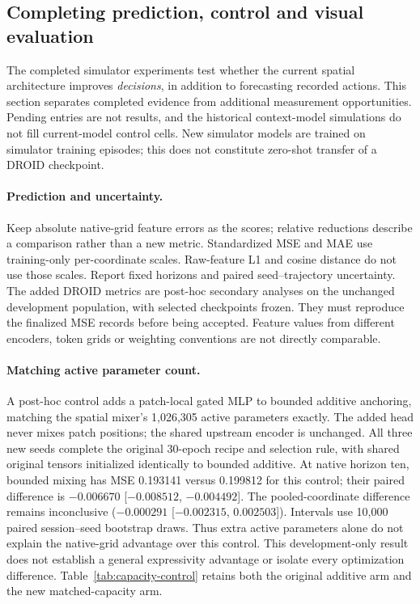 \subsection{Completing prediction, control and visual evaluation}
\label{app:metric-completion}
The completed simulator experiments test whether the current spatial architecture
improves \emph{decisions}, in addition to forecasting recorded actions. This section
separates completed evidence from additional measurement opportunities. Pending entries are not
results, and the historical context-model simulations do not fill current-model
control cells. New simulator models are trained on simulator training episodes;
this does not constitute zero-shot transfer of a DROID checkpoint.



\paragraph{Prediction and uncertainty.}
Keep absolute native-grid feature errors as the scores; relative reductions
describe a comparison rather than a new metric. Standardized MSE and MAE use
training-only per-coordinate scales. Raw-feature L1 and cosine distance do not
use those scales. Report fixed horizons and paired seed--trajectory uncertainty.
The added DROID metrics are post-hoc secondary analyses on the unchanged
development population, with selected checkpoints frozen. They must reproduce
the finalized MSE records before being accepted. Feature values from different
encoders, token grids or weighting conventions are not directly comparable.



\paragraph{Matching active parameter count.}
A post-hoc control adds a patch-local gated MLP to bounded additive anchoring,
matching the spatial mixer's 1,026,305 active parameters exactly. The added
head never mixes patch positions; the shared upstream encoder is unchanged.
All three new seeds complete the original 30-epoch recipe and selection rule,
with shared original tensors initialized identically to bounded additive.
At native horizon ten, bounded mixing has MSE 0.193141 versus 0.199812 for
this control; their paired difference is $-0.006670$
[$-0.008512$, $-0.004492$]. The pooled-coordinate difference remains
inconclusive ($-0.000291$ [$-0.002315$, $0.002503$]). Intervals use 10,000
paired session--seed bootstrap draws. Thus extra active parameters alone do
not explain the native-grid advantage over this control. This development-only
result does not establish a general expressivity advantage or isolate every
optimization difference. Table~\ref{tab:capacity-control} retains both the
original additive arm and the new matched-capacity arm.


